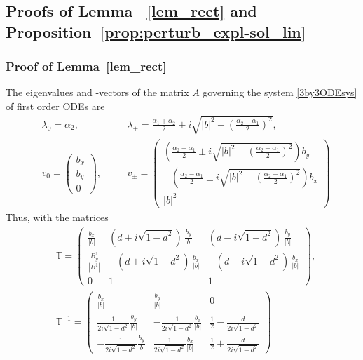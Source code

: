 \documentclass{ws-m3as}
\def\bb{b}
\begin{document}
\medskip



\subsection{Proofs of Lemma ~\ref{lem_rect} and Proposition~\ref{prop:perturb_expl-sol_lin}} 
\subsubsection*{Proof of Lemma~\ref{lem_rect}}
The eigenvalues and -vectors of the matrix $A$ governing the system \eqref{3by3ODEsys} of first order ODEs are
\[
\begin{aligned}
&\lambda_0=\alpha_2, \quad 
&&\lambda_\pm = \frac{\alpha_1+\alpha_2}{2}\pm i\sqrt{|\bb|^2-\left(\frac{\alpha_2-\alpha_1}{2}\right)^2}, \\
&v_0=\left(\begin{array}{c}\bb_x\\ \bb_y\\0\end{array}\right), \quad 
&&v_\pm=\left(\begin{array}{c}
\left(\frac{\alpha_2-\alpha_1}{2}\pm i\sqrt{|\bb|^2-\left(\frac{\alpha_2-\alpha_1}{2}\right)^2}\right)\bb_y\\ 
-\left(\frac{\alpha_2-\alpha_1}{2}\pm i\sqrt{|\bb|^2-\left(\frac{\alpha_2-\alpha_1}{2}\right)^2}\right)\bb_x\\ 
|\bb|^2\end{array}\right)
\end{aligned}
\]
Thus, with the matrices 
\[
\begin{aligned}
&\mathbb{T}=\left(\begin{array}{ccc}
\frac{\bb_x}{|\bb|}&
(d+i\sqrt{1-d^2})\, \frac{\bb_y}{|\bb|}&
(d-i\sqrt{1-d^2})\, \frac{\bb_y}{|\bb|}
\\ 
\frac{B^1_y}{|B^1|}&
-(d+i\sqrt{1-d^2})\, \frac{\bb_x}{|\bb|}&
-(d-i\sqrt{1-d^2})\, \frac{\bb_x}{|\bb|}
\\ 
0&1&1
\end{array}\right), \\
&\mathbb{T}^{-1}=\left(\begin{array}{ccc}
\frac{\bb_x}{|\bb|}&\frac{\bb_y}{|\bb|}&0\\
\frac{1}{2i\sqrt{1-d^2}}\frac{\bb_y}{|\bb|}&-\frac{1}{2i\sqrt{1-d^2}}\frac{\bb_x}{|\bb|}&
\frac12-\frac{d}{2i\sqrt{1-d^2}}
\\
-\frac{1}{2i\sqrt{1-d^2}}\frac{\bb_y}{|\bb|}&\frac{1}{2i\sqrt{1-d^2}}\frac{\bb_x}{|\bb|}&
\frac12+\frac{d}{2i\sqrt{1-d^2}}
\end{array}\right)
\end{aligned}
\]
\end{document}
